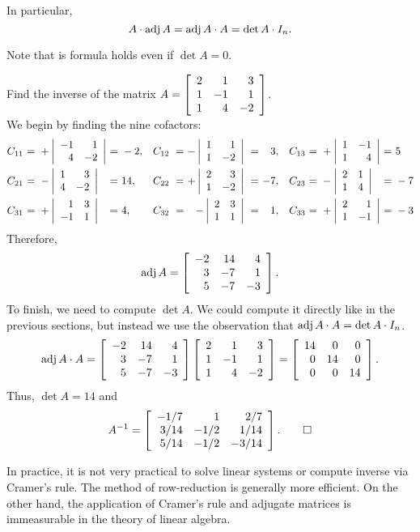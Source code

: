 In particular, 
\[A\cdot \adj A = \adj A\cdot A = \det A\cdot I_n.\]

Note that is formula holds even if $\det A = 0$.\\

\begin{Exam} Find the inverse of the matrix $A = \mtx{rrr}{2&1&3\\1&-1&1\\1&4&-2}$.\\

We begin by finding the nine cofactors:
\[\begin{alignedat}{100}
&C_{11}\ &=\ &+\dtx{rr}{-1&1\\4&-2}\ &=\ &-2,\quad &C_{12}\ &=\ &-\dtx{rr}{1&1\\1&-2}\ &=\ &3,\quad &C_{13}\ &=\ &+\dtx{rr}{1&-1\\1&4}\ &=\ &5&\\
&C_{21}\ &=\ &-\dtx{rr}{1&3\\4&-2}\ &=\ &14,\quad &C_{22}\ &=\ &+\dtx{rr}{2&3\\1&-2}\ &=\ &-7,\quad &C_{23}\ &=\ &-\dtx{rr}{2&1\\1&4}\ &=\ &-7&\\
&C_{31}\ &=\ &+\dtx{rr}{1&3\\-1&1}\ &=\ &4,\quad &C_{32}\ &=\ &-\dtx{rr}{2&3\\1&1}\ &=\ &1,\quad &C_{33}\ &=\ &+\dtx{rr}{2&1\\1&-1}\ &=\ &-3&
\end{alignedat}\] Therefore, 
\[\adj A = \mtx{rrr}{-2 & 14 & 4\\ 3 & -7 & 1 \\ 5 & -7 & -3}.\] To finish, we need to compute $\det A$. We could compute it directly like in the previous sections, but instead we use the observation that $\adj A \cdot A = \det A\cdot I_n$. 
\[\adj A \cdot A = \mtx{rrr}{-2 & 14 & 4\\ 3 & -7 & 1 \\ 5 & -7 & -3}\mtx{rrr}{2&1&3\\1&-1&1\\1&4&-2} = \mtx{rrr}{14&0&0\\0&14&0\\0&0&14}.\] Thus, $\det A = 14$ and 
\[A^{-1} = \mtx{rrr}{-1/7 & 1 & 2/7\\ 3/14 & -1/2 & 1/14 \\ 5/14 & -1/2 & -3/14}. \qedhere\]
\end{Exam}\vs

In practice, it is not very practical to solve linear systems or compute inverse via Cramer's rule. The method of row-reduction is generally more efficient. On the other hand, the application of Cramer's rule and adjugate matrices is immeasurable in the theory of linear algebra.\\

